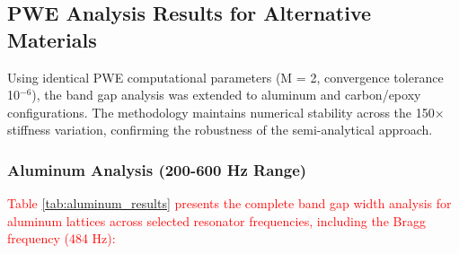 \documentclass[review,numbers,sort&compress]{elsarticle}
\begin{document}
{\subsection{PWE Analysis Results for Alternative Materials}

Using identical PWE computational parameters (M = 2, convergence tolerance 10$^{-6}$), the band gap analysis was extended to aluminum and carbon/epoxy configurations. The methodology maintains numerical stability across the 150× stiffness variation, confirming the robustness of the semi-analytical approach.

\subsubsection{Aluminum Analysis (200-600 Hz Range)}

\textcolor{red}{Table \ref{tab:aluminum_results} presents the complete band gap width analysis for aluminum lattices across selected resonator frequencies, including the Bragg frequency (484 Hz):}

}
\end{document}
